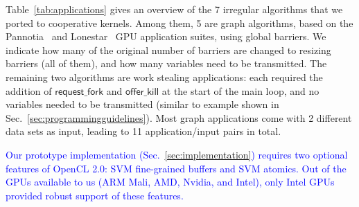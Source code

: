 \documentclass[sigconf]{acmart}
\newcommand{\TSAdded}[1]{\textcolor{blue}{#1}}
\newcommand{\mytablong}{Table~}
\newcommand{\mysec}{Sec.~}
\newcommand{\nvidia}{Nvidia\xspace}
\newcommand{\offerfork}{\mathsf{request\_fork}}
\newcommand{\offerkill}{\mathsf{offer\_kill}}
\begin{document}
{\begin{table}[t]
\label{tab:applications}
\end{table}


\mytablong\ref{tab:applications} gives an overview of the 7 irregular
algorithms that we ported to cooperative kernels. Among them, 5 are
graph algorithms, based on the Pannotia~\cite{Pannotia} and
Lonestar~\cite{BNP12} GPU application suites, using global barriers.
We indicate how many of the original number of barriers are changed to
resizing barriers (all of them), and how many variables need to be
transmitted.  The remaining two algorithms are work stealing
applications: each required the addition of $\offerfork$ and
$\offerkill$ at the start of the main loop, and no variables needed to
be transmitted (similar to example shown in \mysec\ref{sec:programmingguidelines}). 
Most graph applications come with 2 different data sets as input,
leading to 11 application/input pairs in total.


\TSAdded{Our prototype implementation (\mysec\ref{sec:implementation}) requires
two optional features of OpenCL 2.0: SVM fine-grained buffers and SVM
atomics. Out of the GPUs available to us (ARM Mali, AMD, \nvidia, and
Intel), only Intel GPUs provided robust support of these features.}


}
\end{document}
